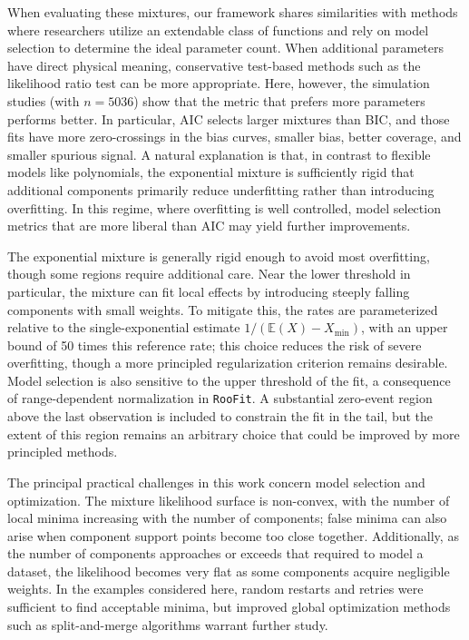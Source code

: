\documentclass[a4paper,11pt]{article}
\begin{document}
When evaluating these mixtures, our framework shares similarities with methods where researchers utilize an extendable class of functions and rely on model selection to determine the ideal parameter count. When additional parameters have direct physical meaning, conservative test-based methods such as the likelihood ratio test can be more appropriate. Here, however, the simulation studies (with $n=5036$) show that the metric that prefers more parameters performs better. In particular, AIC selects larger mixtures than BIC, and those fits have more zero-crossings in the bias curves, smaller bias, better coverage, and smaller spurious signal. A natural explanation is that, in contrast to flexible models like polynomials, the exponential mixture is sufficiently rigid that additional components primarily reduce underfitting rather than introducing overfitting. In this regime, where overfitting is well controlled, model selection metrics that are more liberal than AIC may yield further improvements.

The exponential mixture is generally rigid enough to avoid most overfitting, though some 
regions require additional care. Near the lower threshold in particular, the mixture can fit 
local effects by introducing steeply falling components with small weights.
To mitigate this, the rates are parameterized relative to the single-exponential estimate 
$1/(\mathbb{E}(X)-X_{\min})$, with an upper bound of 50 times this reference rate; this choice 
reduces the risk of severe overfitting, though a more principled regularization criterion 
remains desirable.
Model selection is also sensitive to the upper threshold of the fit, a consequence of 
range-dependent normalization in \texttt{RooFit}. A substantial zero-event region above the 
last observation is included to constrain the fit in the tail, but the extent of this region 
remains an arbitrary choice that could be improved by more principled methods.

The principal practical challenges in this work concern model selection and optimization. 
The mixture likelihood surface is non-convex, with the number of local minima increasing with 
the number of components; false minima can also arise when component support points become too 
close together.
Additionally, as the number of components approaches or exceeds that required to model a 
dataset, the likelihood becomes very flat as some components acquire negligible weights. 
In the examples considered here, random restarts and retries were sufficient to find acceptable 
minima, but improved global optimization methods such as split-and-merge 
algorithms \cite{split-and-merge} warrant further study.
\end{document}
